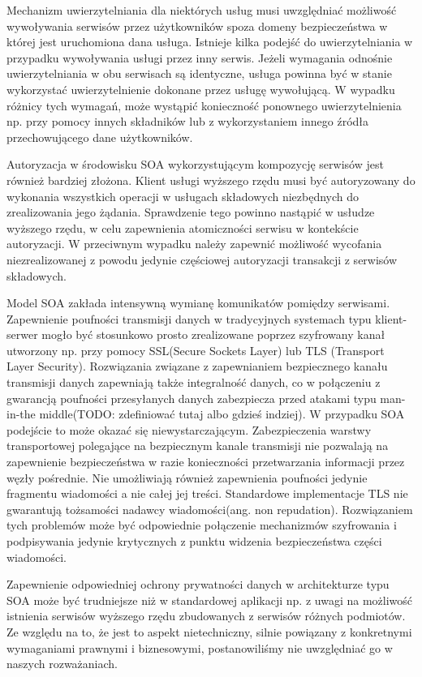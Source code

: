 		Mechanizm uwierzytelniania dla niektórych usług musi uwzględniać możliwość wywoływania serwisów przez użytkowników spoza domeny bezpieczeństwa w której jest uruchomiona dana usługa. Istnieje kilka podejść do uwierzytelniania w przypadku wywoływania usługi przez inny serwis. Jeżeli wymagania odnośnie uwierzytelniania w obu serwisach są identyczne, usługa powinna być w stanie wykorzystać uwierzytelnienie dokonane przez usługę wywołującą. W wypadku różnicy tych wymagań, może wystąpić konieczność ponownego uwierzytelnienia np. przy pomocy innych składników lub z wykorzystaniem innego źródła przechowującego dane użytkowników.

		Autoryzacja w środowisku SOA wykorzystującym kompozycję serwisów jest również bardziej złożona. Klient usługi wyższego rzędu musi być autoryzowany do wykonania wszystkich operacji w usługach składowych niezbędnych do zrealizowania jego żądania. Sprawdzenie tego powinno nastąpić w usłudze wyższego rzędu, w celu zapewnienia atomiczności serwisu w kontekście autoryzacji. W przeciwnym wypadku należy zapewnić możliwość wycofania niezrealizowanej z powodu jedynie częściowej autoryzacji transakcji z serwisów składowych.

		Model SOA zakłada intensywną wymianę komunikatów pomiędzy serwisami. Zapewnienie poufności transmisji danych w tradycyjnych systemach typu klient-serwer mogło być stosunkowo prosto zrealizowane poprzez szyfrowany kanał utworzony np. przy pomocy SSL(Secure Sockets Layer) lub TLS (Transport Layer Security). Rozwiązania związane z zapewnianiem bezpiecznego kanału transmisji danych zapewniają także integralność danych, co w połączeniu z gwarancją poufności przesyłanych danych zabezpiecza przed atakami typu man-in-the middle(TODO: zdefiniować tutaj albo gdzieś indziej). W przypadku SOA podejście to może okazać się niewystarczającym. Zabezpieczenia warstwy transportowej polegające na bezpiecznym kanale transmisji nie pozwalają na zapewnienie bezpieczeństwa w razie konieczności przetwarzania informacji przez węzły pośrednie. Nie umożliwiają również zapewnienia poufności jedynie fragmentu wiadomości a nie całej jej treści. Standardowe implementacje TLS nie gwarantują tożsamości nadawcy wiadomości(ang. non repudation). Rozwiązaniem tych problemów może być odpowiednie połączenie mechanizmów szyfrowania i podpisywania jedynie krytycznych z punktu widzenia bezpieczeństwa części wiadomości.
		
		Zapewnienie odpowiedniej ochrony prywatności danych w architekturze typu SOA może być trudniejsze niż w standardowej aplikacji np. z uwagi na możliwość istnienia serwisów wyższego rzędu zbudowanych z serwisów różnych podmiotów. Ze względu na to, że jest to aspekt nietechniczny, silnie powiązany z konkretnymi wymaganiami prawnymi i biznesowymi, postanowiliśmy nie uwzględniać go w naszych rozważaniach.

